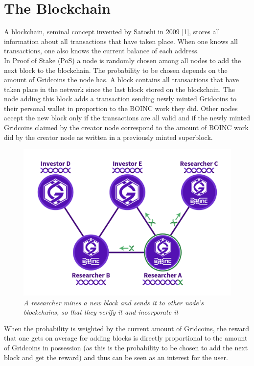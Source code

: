 \section{The Blockchain}

A blockchain, seminal concept invented by Satoshi in 2009 [1], stores all information about all transactions that have taken place. When one knows all transactions, one also knows the current balance of each address.\\

In Proof of Stake (PoS) a node is randomly chosen among all nodes to add the next block to the blockchain. The probability to be chosen depends on the amount of Gridcoins the node has. A block contains all transactions that have taken place in the network since the last block stored on the blockchain. The node adding this block adds a transaction sending newly minted Gridcoins to their personal wallet in proportion to the BOINC work they did. Other nodes accept the new block only if the transactions are all valid and if the newly minted Gridcoins claimed by the creator node correspond to the amount of BOINC work did by the creator node as written in a previously minted superblock. 

\begin{figure}
\centering
\includegraphics[scale=0.5]{figures/NetworkAndNodes_joshoeah}
\medskip
\caption{\textit{A researcher mines a new block and sends it to other node's blockchains, so that they verify it and incorporate it}}
\small
\end{figure}
 
When the probability is weighted by the current amount of Gridcoins, the reward that one gets on average for adding blocks is directly proportional to the amount of Gridcoins in possession (as this is the probability to be chosen to add the next block and get the reward) and thus can be seen as an interest for the user.
